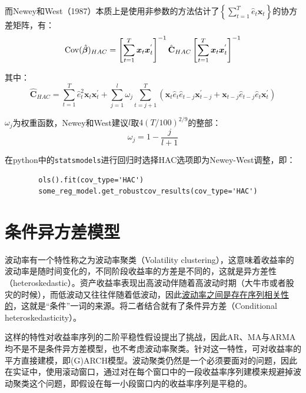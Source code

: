 \documentclass[11pt]{article}
\begin{document}
而Newey和West（1987）本质上是使用非参数的方法估计了$\left\{\sum_{t=1}^{T} \hat{e}_t \bm{x}_t \right\}$的协方差矩阵，有：
\begin{equation*}
    \operatorname{Cov}(\hat{\bm{\beta}})_{HAC} = 
    \left[ \sum_{t=1}^{T} \bm{x}_t \bm{x}_{t}^{'} \right]^{-1} 
    \hat{\mathbf{C}}_{HAC}
    \left[ \sum_{t=1}^{T} \bm{x}_t \bm{x}_{t}^{'} \right]^{-1} 
\end{equation*}

其中：
\begin{equation*}
    \hat{\mathbf{C}}_{HAC} = \sum_{t=1}^{T}\hat{e}_{t}^{2} \bm{x}_t \bm{x}_{t}^{'} + \sum_{j=1}^{l} \omega_j \sum_{t=j+1}^{T}\left( \bm{x}_t \hat{e}_t \hat{e}_{t-j} \bm{x}_{t-j}^{'} + \bm{x}_{t-j} \hat{e}_{t-j} \hat{e}_t \bm{x}_{t}^{'} \right)
\end{equation*}

$\omega_j$为权重函数，Newey和West建议$l$取$4(T/100)^{2/9}$的整部：
\begin{equation*}
    \omega_j = 1 - \frac{j}{l+1}
\end{equation*}

\begin{remark}
    在python中的\verb|statsmodels|进行回归时选择HAC选项即为Newey-West调整，即：
    \begin{verbatim}
        ols().fit(cov_type='HAC')
        some_reg_model.get_robustcov_results(cov_type='HAC')
    \end{verbatim}
\end{remark}

\section{条件异方差模型}

波动率有一个特性称之为波动率聚类（Volatility clustering），这意味着收益率的波动率是随时间变化的，不同阶段收益率的方差是不同的，这就是异方差性（heteroskedastic）。资产收益率表现出高波动伴随着高波动时期（大牛市或者股灾的时候），而低波动又往往伴随着低波动，因此\uline{波动率之间是存在序列相关性的}，这就是“条件”一词的来源。将二者结合就有了条件异方差（Conditional heteroskedasticity）。

这样的特性对收益率序列的二阶平稳性假设提出了挑战，因此AR、MA与ARMA均不是不是条件异方差模型，也不考虑波动率聚类。针对这一特性，可对收益率的平方直接建模，即(G)ARCH模型。波动聚类仍然是一个必须要面对的问题，因此在实证中，使用滚动窗口，通过对在每个窗口中的一段收益率序列建模来规避掉波动聚类这个问题，即假设在每一小段窗口内的收益率序列是平稳的。
\end{document}
